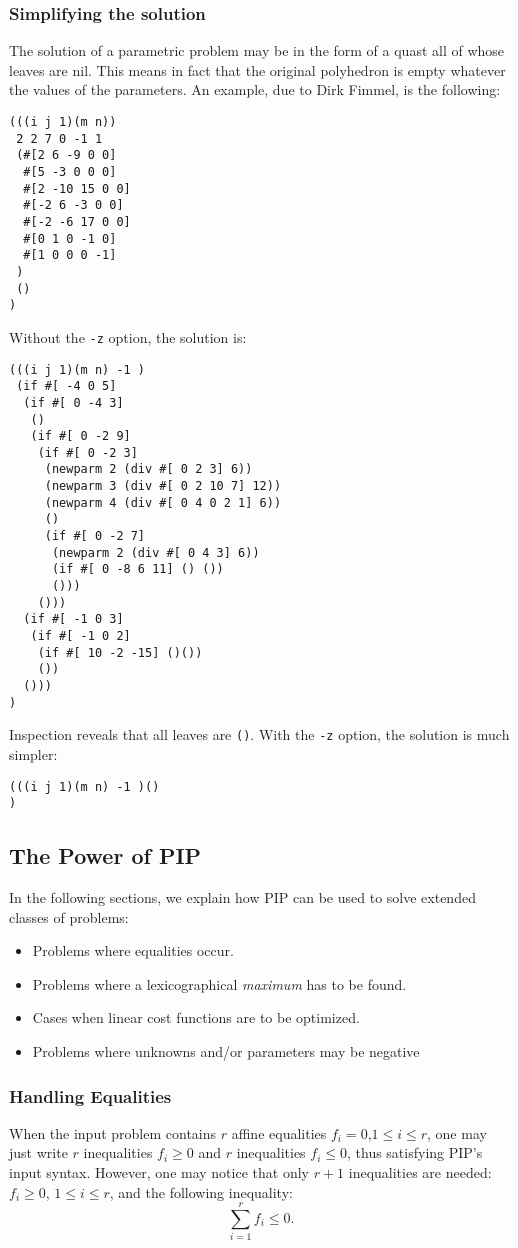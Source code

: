 \documentclass[12pt,a4paper,dvips]{article}
\begin{document}
\subsubsection{Simplifying the solution}

The solution of a parametric problem may be in the form of a quast all
of whose leaves are nil. This means in fact that the original polyhedron
is empty whatever the values of the parameters. An example, due to Dirk
Fimmel, is the following:

\begin{verbatim}
(((i j 1)(m n))
 2 2 7 0 -1 1
 (#[2 6 -9 0 0]
  #[5 -3 0 0 0]
  #[2 -10 15 0 0]
  #[-2 6 -3 0 0]
  #[-2 -6 17 0 0]
  #[0 1 0 -1 0]
  #[1 0 0 0 -1]
 )
 ()
)
\end{verbatim}
Without the {\tt -z} option, the solution is:
\begin{verbatim}
(((i j 1)(m n) -1 )
 (if #[ -4 0 5]
  (if #[ 0 -4 3] 
   ()
   (if #[ 0 -2 9]
    (if #[ 0 -2 3]
     (newparm 2 (div #[ 0 2 3] 6))
     (newparm 3 (div #[ 0 2 10 7] 12))
     (newparm 4 (div #[ 0 4 0 2 1] 6))
     ()
     (if #[ 0 -2 7]
      (newparm 2 (div #[ 0 4 3] 6))
      (if #[ 0 -8 6 11] () ())
      ()))
    ()))
  (if #[ -1 0 3]
   (if #[ -1 0 2]
    (if #[ 10 -2 -15] ()())
    ())
  ()))
)
\end{verbatim}
Inspection reveals that all leaves are {\tt ()}. With the {\tt -z} option,
the solution is much simpler:
\begin{verbatim}
(((i j 1)(m n) -1 )()
)
\end{verbatim}
\subsection{The Power of PIP}
In the following sections, we explain how PIP can be used to solve 
extended classes of problems:
\begin{itemize}
\item Problems where equalities occur.
\item Problems where a lexicographical {\em maximum} has to
be found. 
\item Cases when linear cost functions are to be optimized.
\item Problems where unknowns and/or parameters may be negative
\end{itemize}

\subsubsection{Handling Equalities}
When the input problem contains $r$ affine equalities $f_i = 0$,$1\leq i\leq r$,
 one may just write $r$ inequalities  $f_i \geq 0$ and $r$ inequalities  $f_i \leq 0$,
 thus satisfying PIP's input syntax. However, one may notice that only $r+1$ inequalities
are needed: $f_i \geq 0$, $1\leq i\leq r$, and the following inequality:
\[ \sum_{i=1}^{r} f_i \leq 0.\]
\end{document}
